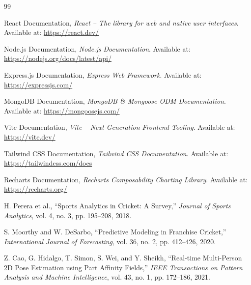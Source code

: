 \documentclass[12pt,a4paper]{report}
\begin{document}
\begin{thebibliography}{99}

React Documentation, \textit{React -- The library for web and native user interfaces}. Available at: \url{https://react.dev/}

Node.js Documentation, \textit{Node.js Documentation}. Available at: \url{https://nodejs.org/docs/latest/api/}

Express.js Documentation, \textit{Express Web Framework}. Available at: \url{https://expressjs.com/}

MongoDB Documentation, \textit{MongoDB & Mongoose ODM Documentation}. Available at: \url{https://mongoosejs.com/}

Vite Documentation, \textit{Vite -- Next Generation Frontend Tooling}. Available at: \url{https://vite.dev/}

Tailwind CSS Documentation, \textit{Tailwind CSS Documentation}. Available at: \url{https://tailwindcss.com/docs}

Recharts Documentation, \textit{Recharts Composability Charting Library}. Available at: \url{https://recharts.org/}

H. Perera et al., ``Sports Analytics in Cricket: A Survey,'' \textit{Journal of Sports Analytics}, vol. 4, no. 3, pp. 195--208, 2018.

S. Moorthy and W. DeSarbo, ``Predictive Modeling in Franchise Cricket,'' \textit{International Journal of Forecasting}, vol. 36, no. 2, pp. 412--426, 2020.

Z. Cao, G. Hidalgo, T. Simon, S. Wei, and Y. Sheikh, ``Real-time Multi-Person 2D Pose Estimation using Part Affinity Fields,'' \textit{IEEE Transactions on Pattern Analysis and Machine Intelligence}, vol. 43, no. 1, pp. 172--186, 2021.

\end{thebibliography}

\clearpage


\end{document}
